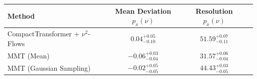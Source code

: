     \begin{tabular}{lccc}
        \toprule
        Method & Mean Deviation $p_{x}(\nu)$ & Resolution $p_{x}(\nu)$ \\
        \midrule
        CompactTransformer + $\nu^2$-Flows & $0.04^{+0.05}_{-0.10}$ & $51.59^{+0.07}_{-0.11}$ \\
        MMT (Mean) & $-0.06^{+0.03}_{-0.04}$ & $31.57^{+0.06}_{-0.04}$ \\
        MMT (Gaussian Sampling) & $-0.02^{+0.05}_{-0.05}$ & $44.43^{+0.03}_{-0.05}$ \\
        \bottomrule
    \end{tabular}